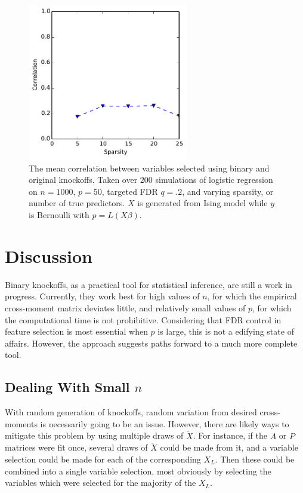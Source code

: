 \documentclass[11pt]{article}
\theoremstyle{definition}
\begin{document}
    \begin{figure}[h]
        \begin{center}
        \includegraphics[width=7cm]{images/logit_corr_50}
    \end{center}
    \caption{The mean correlation between variables selected using binary and original knockoffs. Taken over $200$ simulations of logistic regression on $n=1000$, $p=50$, targeted FDR $q=.2$, and varying sparsity, or number of true predictors. $X$ is generated from Ising model while $y$ is Bernoulli with $p=L(X\beta)$.}  
    \end{figure}

    \FloatBarrier

\section{Discussion}
    Binary knockoffs, as a practical tool for statistical inference, are still a work in progress. Currently, they work best for high values of $n$, for which the empirical cross-moment matrix deviates little, and relatively small values of $p$, for which the computational time is not prohibitive. Considering that FDR control in feature selection is most essential when $p$ is large, this is not a edifying state of affairs. However, the approach suggests paths forward to a much more complete tool. 
    
\subsection{Dealing With Small $n$}
    With random generation of knockoffs, random variation from desired cross-moments is necessarily going to be an issue. However, there are likely ways to mitigate this problem by using multiple draws of $\tilde X$. For instance, if the $A$ or $P$ matrices were fit once, several draws of $\tilde X$ could be made from it, and a variable selection could be made for each of the corresponding $X_L$. Then these could be combined into a single variable selection, most obviously by selecting the variables which were selected for the majority of the $X_L$. 
    
\end{document}
